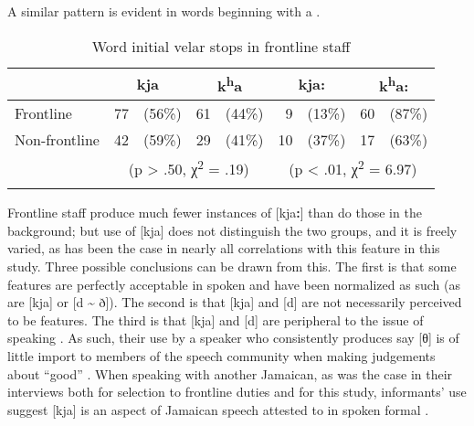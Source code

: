 A similar pattern is evident in words beginning with a .\largerpage

\begin{table}
\begin{tabular}{l *{4}{r@{ }r}}
\lsptoprule
&  \multicolumn{2}{c}{kja}   &  \multicolumn{2}{c}{k\textsuperscript{h}a}   &  \multicolumn{2}{c}{kja:}   &  \multicolumn{2}{c}{k\textsuperscript{h}a:} \\
\midrule
Frontline     & 77 & (56\%) & 61 & (44\%) & 9  & (13\%)  & 60 & (87\%)\\
Non-frontline & 42 & (59\%) & 29 & (41\%) & 10 & (37\%)  & 17 & (63\%) \\\cmidrule(lr){2-5}\cmidrule(lr){6-9}
     &  \multicolumn{4}{c}{(p > .50, χ\textsuperscript{2} = .19)} &  \multicolumn{4}{c}{(p < .01, χ\textsuperscript{2} = 6.97)}\\
\lspbottomrule
\end{tabular}
\caption{Word initial velar stops in frontline staff\label{tab:4.9}}
\end{table}

Frontline staff produce much fewer instances of [kja\textbf{:}] than do those in the background; but use of [kja] does not distinguish the two groups, and it is freely varied, as has been the case in nearly all correlations with this feature in this study.  Three possible conclusions can be drawn from this.  The first is that some  features are perfectly acceptable in spoken  and have been normalized as such (as are [kja] or [d {\textasciitilde} ð]).  The second is that [kja] and [d] are not necessarily perceived to be  features.  The third is that [kja] and [d] are peripheral to the issue of speaking .  As such, their use by a speaker who consistently produces say [θ] is of little import to members of the speech community when making judgements about “good” .  When speaking with another Jamaican, as was the case in their interviews both for selection to frontline duties and for this study, informants’ use suggest [kja] is an aspect of Jamaican speech attested to in spoken formal .

